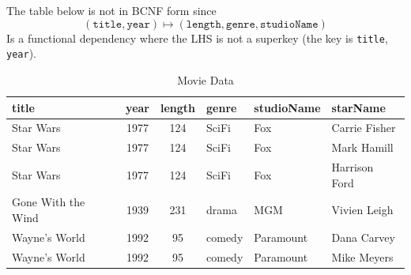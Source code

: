   \begin{example}
    The table below is not in BCNF form since 
    \begin{equation}
      (\texttt{title}, \texttt{year}) \mapsto (\texttt{length}, \texttt{genre}, \texttt{studioName}) 
    \end{equation}
    Is a functional dependency where the LHS is not a superkey (the key is \texttt{title}, \texttt{year}). 
    \begin{table}[H]
      \centering
      \begin{tabular}{|l|c|c|l|l|l|}
      \hline
      \textbf{title} & \textbf{year} & \textbf{length} & \textbf{genre} & \textbf{studioName} & \textbf{starName} \\
      \hline
      Star Wars & 1977 & 124 & SciFi & Fox & Carrie Fisher \\
      Star Wars & 1977 & 124 & SciFi & Fox & Mark Hamill \\
      Star Wars & 1977 & 124 & SciFi & Fox & Harrison Ford \\
      Gone With the Wind & 1939 & 231 & drama & MGM & Vivien Leigh \\
      Wayne's World & 1992 & 95 & comedy & Paramount & Dana Carvey \\
      Wayne's World & 1992 & 95 & comedy & Paramount & Mike Meyers \\
      \hline
      \end{tabular}
      \caption{Movie Data}
      \label{tab:moviedata}
    \end{table} 
  \end{example}

